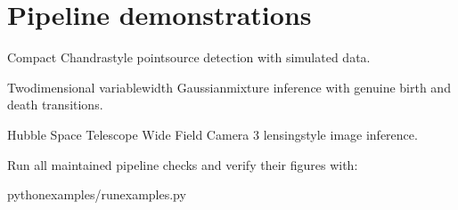 \documentclass[letterpaper,10pt,english]{sphinxmanual}
\begin{document}
\section{Pipeline demonstrations}
\label{\detokenize{examples:pipeline-demonstrations}}\begin{description}
\sphinxAtStartPar
Compact Chandra\sphinxhyphen{}style point\sphinxhyphen{}source detection with simulated data.

\sphinxAtStartPar
Two\sphinxhyphen{}dimensional variable\sphinxhyphen{}width Gaussian\sphinxhyphen{}mixture inference with genuine
birth and death transitions.

\sphinxAtStartPar
Hubble Space Telescope Wide Field Camera 3 lensing\sphinxhyphen{}style image inference.

\end{description}

\sphinxAtStartPar
Run all maintained pipeline checks and verify their figures with:

\begin{sphinxVerbatim}[commandchars=\\\{\}]
pythonexamples/run\PYGZus{}examples.py
\end{sphinxVerbatim}
\end{document}
